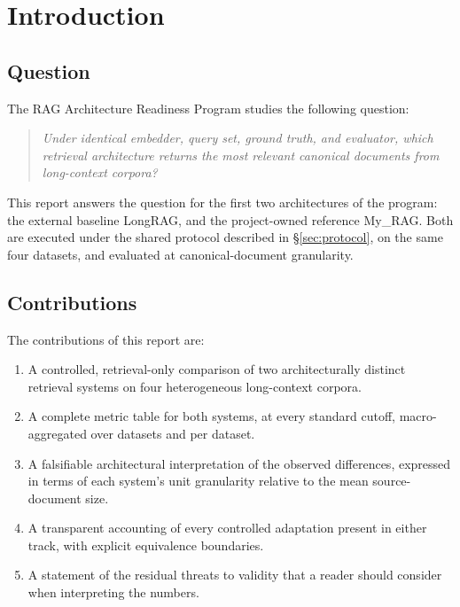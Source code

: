 \documentclass[11pt,a4paper]{article}
\begin{document}
\section{Introduction}

\subsection{Question}
The RAG Architecture Readiness Program studies the following
question:

\begin{quote}
\emph{Under identical embedder, query set, ground truth, and
evaluator, which retrieval architecture returns the most relevant
canonical documents from long-context corpora?}
\end{quote}

This report answers the question for the first two architectures of
the program: the external baseline LongRAG, and the project-owned
reference My\_RAG. Both are executed under the shared protocol
described in \S\ref{sec:protocol}, on the same four datasets, and
evaluated at canonical-document granularity.

\subsection{Contributions}
The contributions of this report are:

\begin{enumerate}[leftmargin=1.5em,itemsep=0.15em]
  \item A controlled, retrieval-only comparison of two
    architecturally distinct retrieval systems on four
    heterogeneous long-context corpora.
  \item A complete metric table for both systems, at every standard
    cutoff, macro-aggregated over datasets and per dataset.
  \item A falsifiable architectural interpretation of the observed
    differences, expressed in terms of each system's unit
    granularity relative to the mean source-document size.
  \item A transparent accounting of every controlled adaptation
    present in either track, with explicit equivalence boundaries.
  \item A statement of the residual threats to validity that a
    reader should consider when interpreting the numbers.
\end{enumerate}
\end{document}
